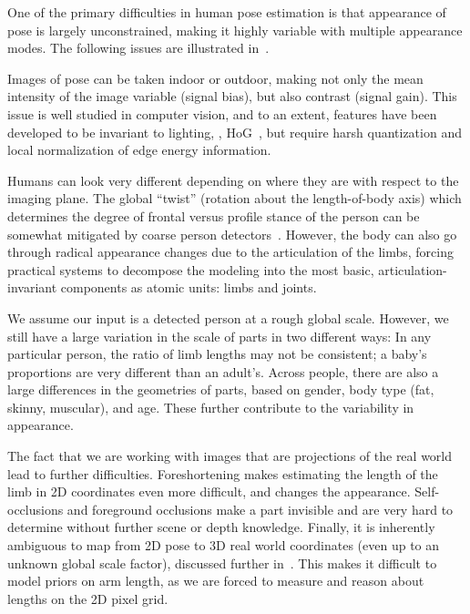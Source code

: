 One of the primary difficulties in human pose estimation is that appearance of 
pose is largely unconstrained, making it highly variable with multiple 
appearance modes.  The following issues are illustrated 
in~.

 Images of pose can be taken indoor or outdoor, making not 
only the mean intensity of the image variable (signal bias), but also contrast 
(signal gain). This issue is well studied in computer vision, and to an extent, 
features have been developed to be invariant to lighting, \eg, HoG~\citep{hog}, 
but require harsh quantization and local normalization of edge energy 
information. 

 Humans can look very different depending on where 
they are with respect to the imaging plane.  The global ``twist'' (rotation 
about the length-of-body axis) which determines the degree of frontal versus 
profile stance of the person can be somewhat mitigated by coarse person 
detectors~\citep{andriluka2010}.  However, the body can also go through radical 
appearance changes due to the articulation of the limbs, forcing practical 
systems to decompose the modeling into the most basic, articulation-invariant 
components as atomic units: limbs and joints.

 We assume our input is a detected person at a rough 
global scale.  However, we still have a large variation in the scale of parts 
in two different ways: In any particular person, the ratio of limb lengths may 
not be consistent; \eg a baby's proportions are very different than an adult's.  
Across people, there are also a large differences in the geometries of parts, 
based on gender, body type (fat, skinny, muscular), and age.  These further 
contribute to the variability in appearance.

 The fact that we are working with images that are 
projections of the real world lead to further difficulties.  Foreshortening 
makes estimating the length of the limb in 2D coordinates even more difficult, 
and changes the appearance.  Self-occlusions and foreground occlusions make a 
part invisible and are very hard to determine without further scene or depth 
knowledge.  Finally, it is inherently ambiguous to map from 2D pose to 3D real 
world coordinates (even up to an unknown global scale factor), discussed 
further in~.  This makes it difficult to model priors on 
arm length, as we are forced to measure and reason about lengths on the 2D 
pixel grid.

